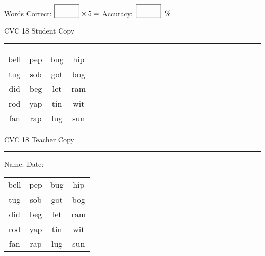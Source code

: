 \documentclass{memoir}
\begin{document}
\small

Words Correct: $\fbox{\phantom{\huge 100}} \times 5 = $ Accuracy: $\fbox{\phantom{\huge 100}}\;\; \%$ 

\vfill

\newpage


\footnotesize \noindent
CVC 18 \hfill Student Copy
\smallskip
\hrule

\Large

\setlength{\tabcolsep}{14pt}
\def\arraystretch{2}

{\selectfont


\begin{vplace}[0.5]
\begin{center}
\begin{tabular}{cccc}
bell & pep & bug & hip \\
tug & sob & got & bog \\
did & beg & let & ram \\
rod & yap & tin & wit \\
fan & rap & lug & sun \\
\end{tabular}
\end{center}
\end{vplace}

}

\newpage

\footnotesize \noindent
CVC 18 \hfill Teacher Copy
\smallskip
\hrule

\small

\vfill

\noindent
Name: \underline{\hspace{1.75in}} \hfill Date: \underline{\hspace{1in}}

\Large

{\selectfont


\begin{vplace}[0.5]
\begin{center}
\begin{tabular}{cccc}
bell & pep & bug & hip \\
tug & sob & got & bog \\
did & beg & let & ram \\
rod & yap & tin & wit \\
fan & rap & lug & sun \\
\end{tabular}
\end{center}
\end{vplace}



}
\end{document}
